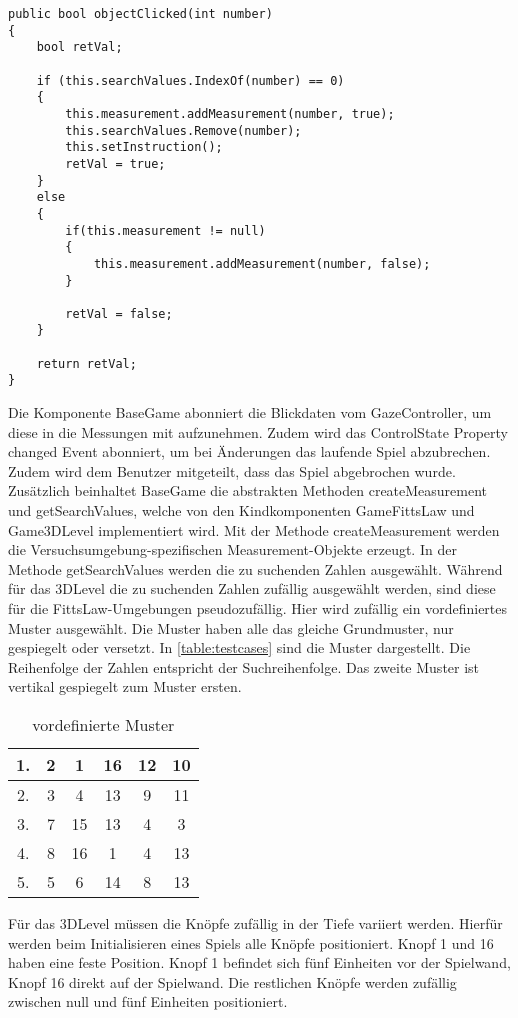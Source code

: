 \begin{lstlisting}[caption=Methode objectClicked,label=lstlisting:objectClicked,float=!htbp]
public bool objectClicked(int number)
{
	bool retVal;
	
	if (this.searchValues.IndexOf(number) == 0)
	{
		this.measurement.addMeasurement(number, true);
		this.searchValues.Remove(number);
		this.setInstruction();
		retVal = true;
	}
	else
	{
		if(this.measurement != null)
		{
			this.measurement.addMeasurement(number, false);
		}
	
		retVal = false;
	}
	
	return retVal;
}
\end{lstlisting}

Die Komponente BaseGame abonniert die Blickdaten vom GazeController, um diese in die Messungen mit aufzunehmen. Zudem wird das ControlState Property changed Event abonniert, um bei Änderungen das laufende Spiel abzubrechen. Zudem wird dem Benutzer mitgeteilt, dass das Spiel abgebrochen wurde. Zusätzlich beinhaltet BaseGame die abstrakten Methoden {\ttfamily createMeasurement} und {\ttfamily getSearchValues}, welche von den Kindkomponenten {\ttfamily GameFittsLaw} und {\ttfamily Game3DLevel} implementiert wird. Mit der Methode createMeasurement werden die Versuchsumgebung-spezifischen Measurement-Objekte erzeugt. In der Methode getSearchValues werden die zu suchenden Zahlen ausgewählt. Während für das 3DLevel die zu suchenden Zahlen zufällig ausgewählt werden, sind diese für die FittsLaw-Umgebungen pseudozufällig. Hier wird zufällig ein vordefiniertes Muster ausgewählt. Die Muster haben alle das gleiche Grundmuster, nur gespiegelt oder versetzt. In \autoref{table:testcases} sind die Muster dargestellt. Die Reihenfolge der Zahlen entspricht der Suchreihenfolge. Das zweite Muster ist vertikal gespiegelt zum Muster ersten. 

\begin{table}[!htbp]
	\centering
	\caption{vordefinierte Muster}
	\label{table:testcases}
	\begin{tabular}{|c ||c c c c c|} 
		\hline
		1. & 2 & 1 & 16 & 12 & 10 \\ 
		\hline
		2. & 3 & 4 & 13 & 9 & 11 \\
		\hline
		3. & 7 & 15 & 13 & 4 & 3 \\
		\hline
		4. & 8 & 16 & 1 & 4 & 13 \\
		\hline
		5. & 5 & 6 & 14 & 8 & 13 \\
		\hline
	\end{tabular}
\end{table}

Für das 3DLevel müssen die Knöpfe zufällig in der Tiefe variiert werden. Hierfür werden beim Initialisieren eines Spiels alle Knöpfe positioniert. Knopf 1 und 16 haben eine feste Position. Knopf 1 befindet sich fünf Einheiten vor der Spielwand, Knopf 16 direkt auf der Spielwand. Die restlichen Knöpfe werden zufällig zwischen null und fünf Einheiten positioniert.
